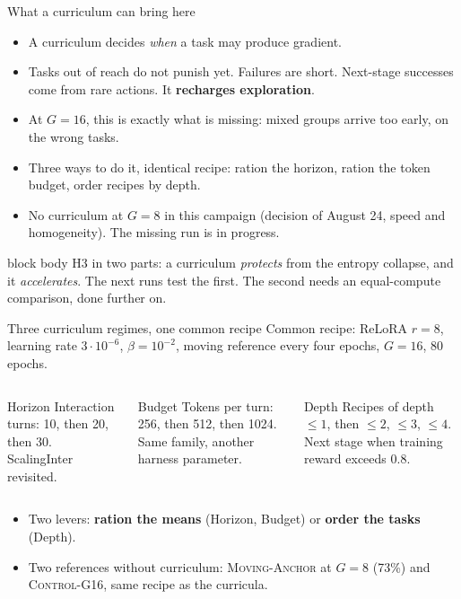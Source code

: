 \documentclass[aspectratio=169,10pt]{beamer}
\newcommand{\hl}[1]{\textcolor{crOrange}{\textbf{#1}}}
\newenvironment{keymsg}{\begin{beamercolorbox}[sep=6pt,wd=\textwidth]{block body}\small}{\end{beamercolorbox}}
\begin{document}
\begin{frame}{What a curriculum can bring here}
\begin{itemize}\setlength{\itemsep}{4pt}
  \item A curriculum decides \emph{when} a task may produce gradient.
  \item Tasks out of reach do not punish yet. Failures are short. Next-stage successes come from rare actions. It \hl{recharges exploration}.
  \item At $G=16$, this is exactly what is missing: mixed groups arrive too early, on the wrong tasks.
  \item Three ways to do it, identical recipe: ration the horizon, ration the token budget, order recipes by depth.
  \item No curriculum at $G=8$ in this campaign (decision of August 24, speed and homogeneity). The missing run is in progress.
\end{itemize}
\vspace{0.3cm}
\begin{keymsg}
H3 in two parts: a curriculum \emph{protects} from the entropy collapse, and it \emph{accelerates}. The next runs test the first. The second needs an equal-compute comparison, done further on.
\end{keymsg}
\end{frame}

\begin{frame}{Three curriculum regimes, one common recipe}
Common recipe: ReLoRA $r{=}8$, learning rate $3\cdot10^{-6}$, $\beta=10^{-2}$, moving reference every four epochs, $G=16$, 80 epochs.
\vspace{0.2cm}
\begin{columns}[T]
\begin{block}{Horizon}
Interaction turns: 10, then 20, then 30. ScalingInter revisited.
\end{block}
\begin{block}{Budget}
Tokens per turn: 256, then 512, then 1024. Same family, another harness parameter.
\end{block}
\begin{block}{Depth}
Recipes of depth $\le 1$, then $\le 2$, $\le 3$, $\le 4$. Next stage when training reward exceeds 0.8.
\end{block}
\end{columns}
\vspace{0.3cm}
\begin{itemize}
  \item Two levers: \hl{ration the means} (Horizon, Budget) or \hl{order the tasks} (Depth).
  \item Two references without curriculum: \textsc{Moving-Anchor} at $G=8$ (73\%) and \textsc{Control-G16}, same recipe as the curricula.
\end{itemize}
\end{frame}
\end{document}
